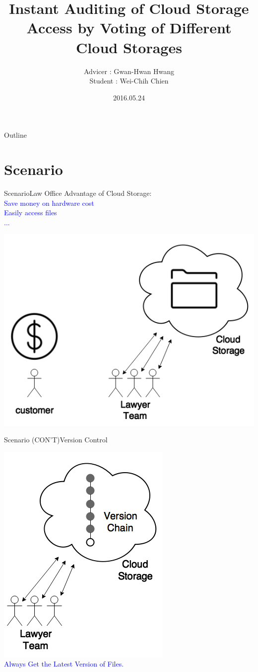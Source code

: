 \documentclass{beamer}
\title[Progress Report]{Instant Auditing of Cloud Storage Access by Voting of Different Cloud Storages}
\author[Wei-Chih Chien]{Advicer : Gwan-Hwan Hwang \texorpdfstring{\\ Student : Wei-Chih Chien}{}}
\institute[NTNU CSIE CCLAB]{NTNU CSIE CCLAB}
\date{2016.05.24}
\begin{document}
\begin{CJK}{UTF8}{bkai}

\begin{frame}
  \titlepage
\end{frame}

\begin{frame}{Outline}
  \tableofcontents
\end{frame}

\section{Scenario}
\begin{frame}{Scenario}{Law Office}
	\alert{Advantage of Cloud Storage:}\\
	\textcolor{blue}{
		\hspace{.1\textwidth}Save money on hardware cost\\
		\hspace{.1\textwidth}Easily access files\\
		\hspace{.1\textwidth}...
	}
	\begin{center}
		\includegraphics[width=.5\textwidth]{Scenario1}
	\end{center}
\end{frame}

\begin{frame}{Scenario (CON'T)}{Version Control}
	\begin{center}
		\includegraphics[width=.4\textwidth]{Scenario2}\\
		\textcolor{blue}{Always Get the Latest Version of Files.}
	\end{center}
\end{frame}


\end{CJK}
\end{document}
